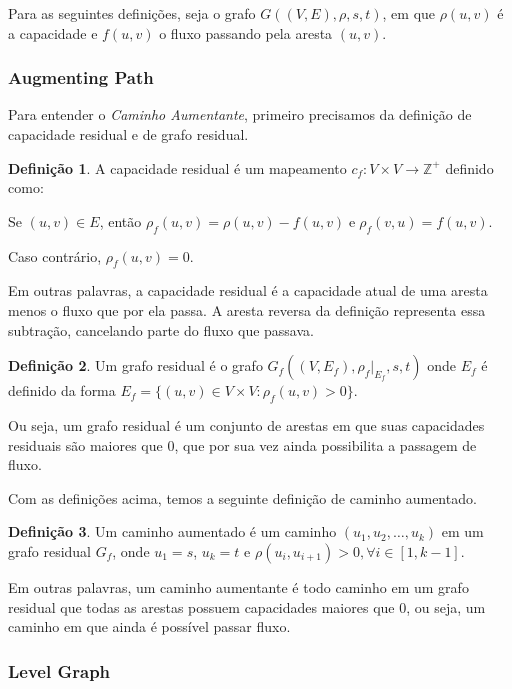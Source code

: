 \documentclass[
	12pt,
	a4paper,
	onepage,
	brazil
]{article}
\theoremstyle{definition}
\newtheorem{definition}{Definição}
\begin{document}
	Para as seguintes definições, seja o grafo $G((V,E),\rho,s,t)$, em que $\rho(u,v)$ é a capacidade e $f(u,v)$ o fluxo passando pela aresta $(u,v)$.
	
	\subsubsection{Augmenting Path}
	
	Para entender o \textit{Caminho Aumentante}, primeiro precisamos da definição de capacidade residual e de grafo residual.
	
	\begin{definition}
	\label{residual-cap-def}
	A capacidade residual é um mapeamento $c_f \colon V \times V \to \mathbb{Z}^+$ definido como:
	
	Se $(u,v) \in E$, então $\rho_f(u,v) = \rho(u,v)-f(u,v) \; \mathrm{e} \; \rho_f(v,u) = f(u,v)$.
	
	Caso contrário, $\rho_f(u,v)=0$.
	\end{definition}

	Em outras palavras, a capacidade residual é a capacidade atual de uma aresta menos o fluxo que por ela passa. A aresta reversa da definição representa essa subtração, cancelando parte do fluxo que passava.
	
	\begin{definition}
	\label{residual-g-def}
	Um grafo residual é o grafo $G_f((V,E_f), \rho_f|_{E_f}, s,t)$ onde $E_f$ é definido da forma $E_f = \{(u,v) \in V \times V \colon \rho_f(u,v) > 0 \}$.
	\end{definition}

	Ou seja, um grafo residual é um conjunto de arestas em que suas capacidades residuais são maiores que $0$, que por sua vez ainda possibilita a passagem de fluxo.
	
	Com as definições acima, temos a seguinte definição de caminho aumentado.
	
	\begin{definition}
		\label{aug-path-def}
		Um caminho aumentado é um caminho $(u_1,u_2,\dots,u_k)$ em um grafo residual $G_f$, onde $u_1 = s$, $u_k = t$ e $\rho(u_i,u_{i+1}) > 0, \forall i \in [1, k-1]$.
	\end{definition}

	Em outras palavras, um caminho aumentante é todo caminho em um grafo residual que todas as arestas possuem capacidades maiores que $0$, ou seja, um caminho em que ainda é possível passar fluxo.
	
	\subsubsection{Level Graph}
	
\end{document}
